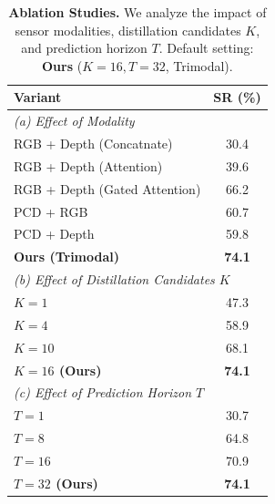 \begin{table}[t]
    \centering
    \small
    \setlength{\tabcolsep}{12pt} 
    \renewcommand{\arraystretch}{1.15} 
    \caption{\textbf{Ablation Studies.} We analyze the impact of sensor modalities, distillation candidates $K$, and prediction horizon $T$. Default setting: \textbf{Ours} ($K{=}16, T{=}32$, Trimodal).}
    \label{tab:ablation_unified}
    
    \begin{tabular}{lc}
        \toprule
        \textbf{Variant} & \textbf{SR (\%)} \\
        \midrule
        \multicolumn{2}{l}{\textit{(a) Effect of Modality}} \\
        \midrule
        RGB + Depth (Concatnate) & 30.4 \\
        RGB + Depth (Attention) & 39.6 \\
        RGB + Depth (Gated Attention) & 66.2 \\
        PCD + RGB & 60.7 \\
        PCD + Depth & 59.8 \\
        \rowcolor{gray!10} \textbf{Ours (Trimodal)} & \textbf{74.1} \\ 
        
        \midrule
        \multicolumn{2}{l}{\textit{(b) Effect of Distillation Candidates $K$}} \\
        \midrule
        $K = 1$ & 47.3 \\
        $K = 4$ & 58.9 \\
        $K = 10$ & 68.1 \\
        \textbf{$K = 16$ (Ours)} & \textbf{74.1} \\
        
        \midrule
        \multicolumn{2}{l}{\textit{(c) Effect of Prediction Horizon $T$}} \\
        \midrule
        $T = 1$ & 30.7 \\
        $T = 8$ & 64.8 \\
        $T = 16$ & 70.9 \\
        \textbf{$T = 32$ (Ours)} & \textbf{74.1} \\
        \bottomrule
    \end{tabular}
\end{table}

